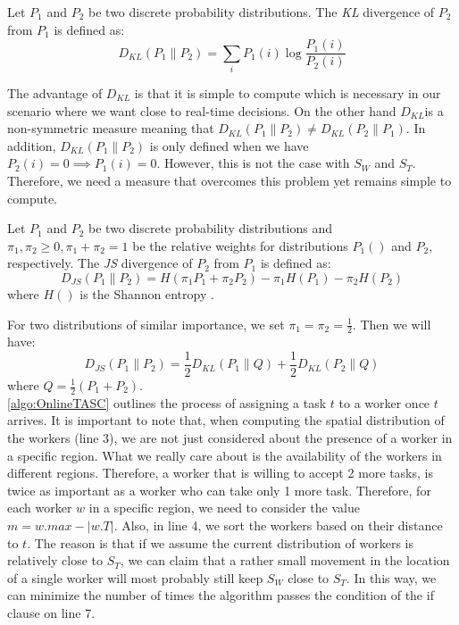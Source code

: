 \begin{definition}
\label{def:KLD}
Let $P_1$ and $P_2$ be two discrete probability distributions. The \emph{KL} divergence \cite{Kullback51} of $P_2$ from $P_1$ is defined as:
\begin{equation*}
D_{KL}\left( P_1 \parallel P_2 \right) = \sum_i P_1(i) \log \frac{P_1(i)}{P_2(i)}
\end{equation*}
\end{definition}

The advantage of $D_{KL}$ is that it is simple to compute which is necessary in our scenario where we want close to real-time decisions. On the other hand $D_{KL}$is a non-symmetric measure meaning that $D_{KL}(P_1 \parallel P_2) \neq D_{KL}(P_2 \parallel P_1)$. In addition, $D_{KL}(P_1 \parallel P_2)$ is only defined when we have $P_2(i) = 0 \implies P_1(i) = 0$. However, this is not the case with $S_W$ and $S_T$. Therefore, we need a measure that overcomes this problem yet remains simple to compute.

\begin{definition}
Let $P_1$ and $P_2$ be two discrete probability distributions and $\pi_1, \pi_2 \geq 0, \pi_1 + \pi_2 = 1$ be the relative weights for distributions $P_1()$ and $P_2$, respectively. The \emph{JS} divergence \cite{Lin91} of $P_2$ from $P_1$ is defined as:
\begin{equation*}
D_{JS}\left( P_1 \parallel P_2 \right) = H \left( \pi_1P_1 + \pi_2P_2 \right) - \pi_1H\left( P_1 \right) - \pi_2H\left( P_2 \right)
\end{equation*}
where $H()$ is the Shannon entropy \cite{Shannon48}.
\end{definition}

For two distributions of similar importance, we set $\pi_1 = \pi_2 = \frac{1}{2}$. Then we will have:
\begin{equation*}
D_{JS}\left( P_1 \parallel P_2 \right) = \frac{1}{2}D_{KL} \left( P_1 \parallel Q \right) + \frac{1}{2}D_{KL} \left( P_2 \parallel Q \right)
\end{equation*}
where $Q = \frac{1}{2} \left( P_1 + P_2 \right)$.\\

\cref{algo:OnlineTASC} outlines the process of assigning a task $t$ to a worker once $t$ arrives. It is important to note that, when computing the spatial distribution of the workers (line 3), we are not just considered about the presence of a worker in a specific region. What we really care about is the availability of the workers in different regions. Therefore, a worker that is willing to accept 2 more tasks, is twice as important as a worker who can take only 1 more task. Therefore, for each worker $w$ in a specific region, we need to consider the value $m = w.max - \left\vert w.T \right\vert$. Also, in line 4, we sort the workers based on their distance to $t$. The reason is that if we assume the current distribution of workers is relatively close to $S_T$, we can claim that a rather small movement in the location of a single worker will most probably still keep $S_W$ close to $S_T$. In this way, we can minimize the number of times the algorithm passes the condition of the if clause on line 7. 

